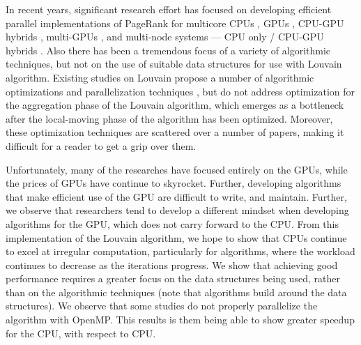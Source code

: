 In recent years, significant research effort has focused on developing efficient parallel implementations of PageRank for multicore CPUs \cite{staudt2015engineering, staudt2016networkit, com-fazlali17, com-halappanavar17, qie2022isolate}, GPUs \cite{com-naim17}, CPU-GPU hybrids \cite{com-bhowmik19, com-mohammadi20}, multi-GPUs \cite{com-cheong13, hricik2020using, chou2022batched, com-gawande22}, and multi-node systems --- CPU only \cite{com-ghosh18, ghosh2018scalable, sattar2022scalable} / CPU-GPU hybrids \cite{com-bhowmick22}. Also there has been a tremendous focus of a variety of algorithmic techniques, but not on the use of suitable data structures for use with Louvain algorithm. Existing studies on Louvain propose a number of algorithmic optimizations \cite{com-rotta11, com-waltman13, com-gach14, com-traag15, com-lu15, com-ryu16, com-ozaki16, com-naim17, com-halappanavar17, com-ghosh18, com-traag19, com-zhang21, com-shi21, com-you22, com-aldabobi22} and parallelization techniques \cite{com-cheong13, com-wickramaarachchi14, com-lu15, com-zeng15, com-que15, com-naim17, com-fazlali17, com-halappanavar17, com-zeitz17, com-ghosh18, com-bhowmik19, com-gheibi20, com-shi21, com-bhowmick22}, but do not address optimization for the aggregation phase of the Louvain algorithm, which emerges as a bottleneck after the local-moving phase of the algorithm has been optimized. Moreover, these optimization techniques are scattered over a number of papers, making it difficult for a reader to get a grip over them.

Unfortunately, many of the researches have focused entirely on the GPUs, while the prices of GPUs have continue to skyrocket. Further, developing algorithms that make efficient use of the GPU are difficult to write, and maintain. Further, we observe that researchers tend to develop a different mindset when developing algorithms for the GPU, which does not carry forward to the CPU. From this implementation of the Louvain algorithm, we hope to show that CPUs continue to excel at irregular computation, particularly for algorithms, where the workload continues to decrease as the iterations progress. We show that achieving good performance requires a greater focus on the data structures being used, rather than on the algorithmic techniques (note that algorithms build around the data structures). We observe that some studies do not properly parallelize the algorithm with OpenMP. This results is them being able to show greater speedup for the CPU, with respect to CPU.

